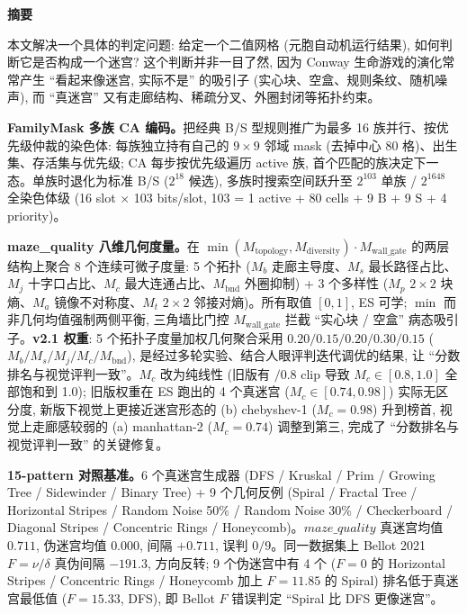 
\begin{center}
{\large\bfseries\textcolor{Vermilion}{摘\quad 要}}
\end{center}

\noindent
本文解决一个具体的判定问题: 给定一个二值网格 (元胞自动机运行结果), 如何判断它是否构成一个迷宫? 这个判断并非一目了然, 因为 Conway 生命游戏的演化常常产生 ``看起来像迷宫, 实际不是'' 的吸引子 (实心块、空盒、规则条纹、随机噪声), 而 ``真迷宫'' 又有走廊结构、稀疏分叉、外圈封闭等拓扑约束。

\noindent\textbf{FamilyMask 多族 CA 编码。}把经典 B/S 型规则推广为最多 16 族并行、按优先级仲裁的染色体: 每族独立持有自己的 $9 \times 9$ 邻域 mask (去掉中心 80 格)、出生集、存活集与优先级; CA 每步按优先级遍历 active 族, 首个匹配的族决定下一态。单族时退化为标准 B/S ($2^{18}$ 候选), 多族时搜索空间跃升至 $2^{103}$ 单族 / $2^{1648}$ 全染色体级 (16 slot $\times$ 103 bits/slot, 103 = 1 active + 80 cells + 9 B + 9 S + 4 priority)。

\noindent\textbf{maze\_quality 八维几何度量。}在 $\min(M_{\text{topology}}, M_{\text{diversity}}) \cdot M_{\text{wall\_gate}}$ 的两层结构上聚合 8 个连续可微子度量: 5 个拓扑 ($M_b$ 走廊主导度、$M_s$ 最长路径占比、$M_j$ 十字口占比、$M_c$ 最大连通占比、$M_{\text{bnd}}$ 外圈抑制) + 3 个多样性 ($M_p$ $2{\times}2$ 块熵、$M_a$ 镜像不对称度、$M_t$ $2{\times}2$ 邻接对熵)。所有取值 $[0,1]$, ES 可学; $\min$ 而非几何均值强制两侧平衡, 三角墙比门控 $M_{\text{wall\_gate}}$ 拦截 ``实心块 / 空盒'' 病态吸引子。\textbf{v2.1 权重}: 5 个拓扑子度量加权几何聚合采用 $0.20/0.15/0.20/0.30/0.15$ ($M_b/M_s/M_j/M_c/M_{\text{bnd}}$), 是经过多轮实验、结合人眼评判迭代调优的结果, 让 ``分数排名与视觉评判一致''。$M_c$ 改为纯线性 (旧版有 $/0.8$ clip 导致 $M_c \in [0.8, 1.0]$ 全部饱和到 1.0); 旧版权重在 ES 跑出的 4 个真迷宫 ($M_c \in [0.74, 0.98]$) 实际无区分度, 新版下视觉上更接近迷宫形态的 (b) chebyshev-1 ($M_c = 0.98$) 升到榜首, 视觉上走廊感较弱的 (a) manhattan-2 ($M_c = 0.74$) 调整到第三, 完成了 ``分数排名与视觉评判一致'' 的关键修复。

\noindent\textbf{15-pattern 对照基准。}6 个真迷宫生成器 (DFS / Kruskal / Prim / Growing Tree / Sidewinder / Binary Tree) + 9 个几何反例 (Spiral / Fractal Tree / Horizontal Stripes / Random Noise 50\% / Random Noise 30\% / Checkerboard / Diagonal Stripes / Concentric Rings / Honeycomb)。$maze\_quality$ 真迷宫均值 $0.711$, 伪迷宫均值 $0.000$, 间隔 $+0.711$, 误判 $0/9$。同一数据集上 Bellot 2021 $F = \nu/\delta$ 真伪间隔 $-191.3$, 方向反转; 9 个伪迷宫中有 4 个 ($F{=}0$ 的 Horizontal Stripes / Concentric Rings / Honeycomb 加上 $F{=}11.85$ 的 Spiral) 排名低于真迷宫最低值 ($F{=}15.33$, DFS), 即 Bellot $F$ 错误判定 ``Spiral 比 DFS 更像迷宫''。

